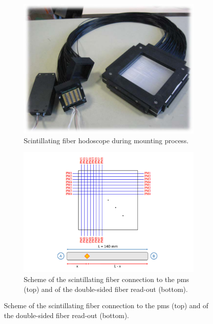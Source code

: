 \begin{figure}
\begin{subfigure}[t]{0.5\textwidth}
\centering
\includegraphics[width=1\textwidth]{03_GraphicFiles/chapter3_CLaRySproto/Hodoscope/Hodoscope_mounting.jpg}
\caption{Scintillating fiber hodoscope during mounting process.}
\label{chap3::fig::HodoMounting}
\end{subfigure}
\begin{subfigure}[t]{0.5\textwidth}
\centering
\includegraphics[width=1\textwidth]{03_GraphicFiles/chapter3_CLaRySproto/Hodoscope/hodoPMfiberConnection.pdf}
\caption{Scheme of the scintillating fiber connection to the \glspl{pm} (top) and of the double-sided fiber read-out (bottom).}
\label{chap3::fig::HodoPMfiberConn}
\end{subfigure}

\end{figure}
